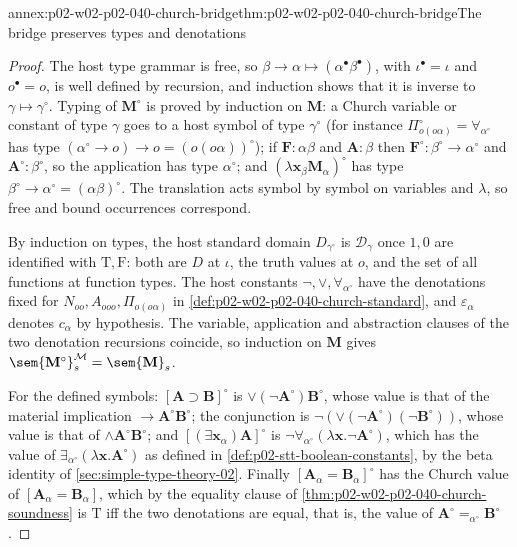 \begin{annexitem}{annex:p02-w02-p02-040-church-bridge}{thm:p02-w02-p02-040-church-bridge}{The bridge preserves types and denotations}
\begin{proof}
The host type grammar is free, so \(\beta\to\alpha\mapsto(\alpha^\bullet\beta^\bullet)\),
with \(\iota^\bullet=\iota\) and \(o^\bullet=o\), is well defined by recursion,
and induction shows that it is inverse to \(\gamma\mapsto\gamma^\circ\).
Typing of \(\mathbf M^\circ\) is proved by induction on \(\mathbf M\): a
Church variable or constant of type \(\gamma\) goes to a host symbol of
type \(\gamma^\circ\) (for instance \(\Pi_{o(o\alpha)}^\circ=\forall_{\alpha^\circ}\)
has type \((\alpha^\circ\to o)\to o=(o(o\alpha))^\circ\)); if
\(\mathbf F:\alpha\beta\) and \(\mathbf A:\beta\) then
\(\mathbf F^\circ:\beta^\circ\to\alpha^\circ\) and
\(\mathbf A^\circ:\beta^\circ\), so the application has type \(\alpha^\circ\);
and \((\lambda\mathbf x_\beta\mathbf M_\alpha)^\circ\) has type
\(\beta^\circ\to\alpha^\circ=(\alpha\beta)^\circ\).  The translation acts
symbol by symbol on variables and \(\lambda\), so free and bound
occurrences correspond.

By induction on types, the host standard domain \(D_{\gamma^\circ}\) is
\(\mathcal D_\gamma\) once \(1,0\) are identified with \(\mathrm T,\mathrm F\):
both are \(D\) at \(\iota\), the truth values at \(o\), and the set of all
functions at function types.  The host constants \(\neg,\lor,\forall_{\alpha^\circ}\)
have the denotations fixed for \(N_{oo},A_{ooo},\Pi_{o(o\alpha)}\) in
\cref{def:p02-w02-p02-040-church-standard}, and \(\varepsilon_\alpha\) denotes
\(c_\alpha\) by hypothesis.  The variable, application and abstraction
clauses of the two denotation recursions coincide, so induction on
\(\mathbf M\) gives \(\sem{\mathbf M^\circ}^{\mathcal M}_s=\sem{\mathbf M}_s\).

For the defined symbols: \([\mathbf A\supset\mathbf B]^\circ\) is
\(\lor(\neg\mathbf A^\circ)\mathbf B^\circ\), whose value is that of the material
implication \(\to\mathbf A^\circ\mathbf B^\circ\); the conjunction is
\(\neg(\lor(\neg\mathbf A^\circ)(\neg\mathbf B^\circ))\), whose value is that of
\(\land\mathbf A^\circ\mathbf B^\circ\); and
\([(\exists\mathbf x_\alpha)\mathbf A]^\circ\) is
\(\neg\forall_{\alpha^\circ}(\lambda\mathbf x.\neg\mathbf A^\circ)\), which has
the value of \(\exists_{\alpha^\circ}(\lambda\mathbf x.\mathbf A^\circ)\) as
defined in \cref{def:p02-stt-boolean-constants}, by the beta identity of
\cref{sec:simple-type-theory-02}.  Finally
\([\mathbf A_\alpha=\mathbf B_\alpha]^\circ\) has the Church value of
\([\mathbf A_\alpha=\mathbf B_\alpha]\), which by the equality clause of
\cref{thm:p02-w02-p02-040-church-soundness} is \(\mathrm T\) iff the two
denotations are equal, that is, the value of
\(\mathbf A^\circ=_{\alpha^\circ}\mathbf B^\circ\).
\end{proof}
\end{annexitem}

